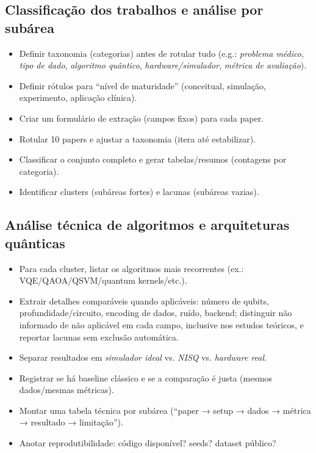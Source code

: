 \documentclass[11pt]{article}
\begin{document}
\subsection{Classificação dos trabalhos e análise por subárea}
\begin{itemize}
  \item [ ] Definir taxonomia (categorias) antes de rotular tudo (e.g.:
    \emph{problema médico}, \emph{tipo de dado}, \emph{algoritmo quântico}, \emph{hardware/simulador}, \emph{métrica de avaliação}).
  \item [ ] Definir rótulos para ``nível de maturidade'' (conceitual, simulação, experimento, aplicação clínica).
  \item [ ] Criar um formulário de extração (campos fixos) para cada paper.
  \item [ ] Rotular 10 papers e ajustar a taxonomia (itera até estabilizar).
  \item [ ] Classificar o conjunto completo e gerar tabelas/resumos (contagens por categoria).
  \item [ ] Identificar clusters (subáreas fortes) e lacunas (subáreas vazias).
\end{itemize}

\subsection{Análise técnica de algoritmos e arquiteturas quânticas}
\begin{itemize}
  \item [ ] Para cada cluster, listar os algoritmos mais recorrentes (ex.: VQE/QAOA/QSVM/quantum kernels/etc.).
  \item [ ] Extrair detalhes comparáveis quando aplicáveis: número de qubits, profundidade/circuito, encoding de dados, ruído, backend; distinguir não informado de não aplicável em cada campo, inclusive nos estudos teóricos, e reportar lacunas sem exclusão automática.
  \item [ ] Separar resultados em \emph{simulador ideal} vs. \emph{NISQ} vs. \emph{hardware real}.
  \item [ ] Registrar se há baseline clássico e se a comparação é justa (mesmos dados/mesmas métricas).
  \item [ ] Montar uma tabela técnica por subárea (``paper → setup → dados → métrica → resultado → limitação'').
  \item [ ] Anotar reprodutibilidade: código disponível? seeds? dataset público?
\end{itemize}
\end{document}
